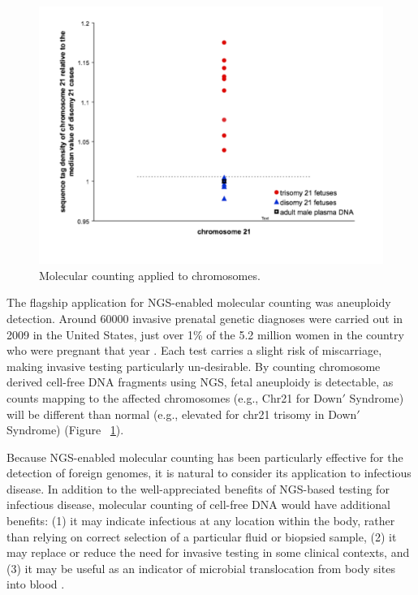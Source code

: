 \begin{figure}
\center\includegraphics[width=130mm,scale=0.5]{Figures/FIg31}
\caption{Molecular counting applied to chromosomes.}
\label{fig:Fig31}
\end{figure}

The flagship application for NGS-enabled molecular counting was aneuploidy detection. Around $60000$ invasive prenatal genetic diagnoses were carried out in 2009 in the United States, just over 1\% of the 5.2 million women in the country who were pregnant that year \cite{Bianchi:2012uc}. Each test carries a slight risk of miscarriage, making invasive testing particularly un-desirable. By counting chromosome derived cell-free DNA fragments using NGS, fetal aneuploidy is detectable, as counts mapping to the affected chromosomes (e.g., Chr21 for Down$'$ Syndrome) will be different than normal (e.g., elevated for chr21 trisomy in Down$'$ Syndrome) (Figure ~\ref{fig:Fig31}).

Because NGS-enabled molecular counting has been particularly effective for the detection of foreign genomes, it is natural to consider its application to infectious disease. In addition to the well-appreciated benefits of NGS-based testing for infectious disease, molecular counting of cell-free DNA  would have additional benefits: (1) it may indicate infectious at any location within the body, rather than relying on correct selection of a particular fluid or biopsied sample, (2) it may replace or reduce the need for invasive testing in some clinical contexts, and (3) it may be useful as an indicator of microbial translocation from body sites into blood \cite{Sonis:2004fj}.

